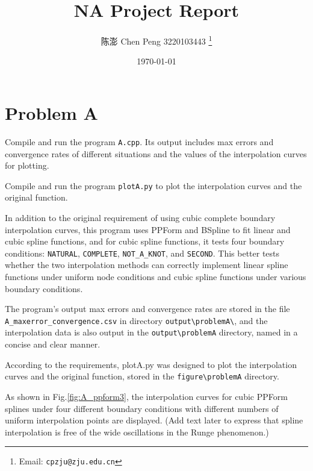 \documentclass[a4paper]{article}
\begin{document}
\begin{sloppypar}
\title{NA Project Report}

\author{陈澎 Chen Peng 3220103443
  \thanks{Email: \texttt{cpzju@zju.edu.cn}}}

\date{\today}

\maketitle

\section{Problem A}
Compile and run the program \verb|A.cpp|. Its output includes max errors and convergence rates of different situations and the values of the interpolation curves for plotting.

Compile and run the program \verb|plotA.py| to plot the interpolation curves
and the original function.

In addition to the original requirement of using cubic complete boundary
interpolation curves, this program uses PPForm and BSpline to fit linear and
cubic spline functions, and for cubic spline functions, it tests four boundary
conditions: \verb|NATURAL|, \verb|COMPLETE|, \verb|NOT_A_KNOT|, and
\verb|SECOND|. This better tests whether the two interpolation methods can
correctly implement linear spline functions under uniform node conditions and
cubic spline functions under various boundary conditions.

The program's output max errors and convergence rates are stored in the file
\verb|A_maxerror_convergence.csv| in directory \verb|output\problemA\|, and the
interpolation data is also output in the \verb|output\problemA| directory,
named in a concise and clear manner.

According to the requirements, plotA.py was designed to plot the interpolation
curves and the original function, stored in the \verb|figure\problemA|
directory.

As shown in Fig.\ref{fig:A_ppform3}, the interpolation curves for cubic PPForm
splines under four different boundary conditions with different numbers of
uniform interpolation points are displayed. (Add text later to express that
spline interpolation is free of the wide oscillations in the Runge phenomenon.)


\end{sloppypar}
\end{document}
